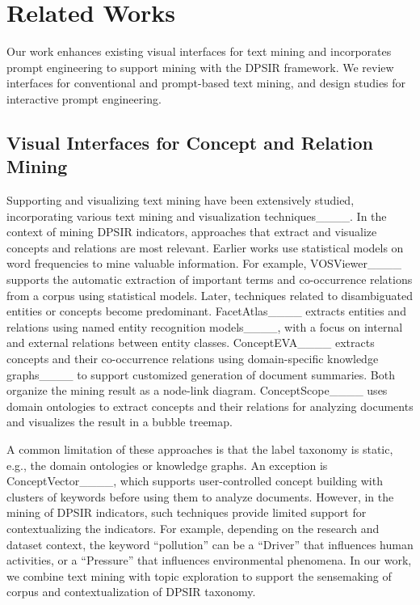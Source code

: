 \section{Related Works}
Our work enhances existing visual interfaces for text mining and incorporates prompt engineering to support mining with the DPSIR framework.
We review interfaces for conventional and prompt-based text mining, and design studies for interactive prompt engineering.

\vspace*{-0.15cm}
\subsection{Visual Interfaces for Concept and Relation Mining}
Supporting and visualizing text mining have been extensively studied, incorporating various text mining and visualization techniques____. 
In the context of mining DPSIR indicators, approaches that extract and visualize concepts and relations are most relevant.
Earlier works use statistical models on word frequencies to mine valuable information.
For example, VOSViewer____ supports the automatic extraction of important terms and co-occurrence relations from a corpus using statistical models. 
Later, techniques related to disambiguated entities or concepts become predominant.
FacetAtlas____ extracts entities and relations using named entity recognition models____, with a focus on internal and external relations between entity classes. 
ConceptEVA____ extracts concepts and their co-occurrence relations using domain-specific knowledge graphs____ to support customized generation of document summaries.
Both organize the mining result as a node-link diagram.
ConceptScope____ uses domain ontologies to extract concepts and their relations for analyzing documents and visualizes the result in a bubble treemap.

A common limitation of these approaches is that the label taxonomy is static, e.g., the domain ontologies or knowledge graphs.
An exception is ConceptVector____, which supports user-controlled concept building with clusters of keywords before using them to analyze documents.
However, in the mining of DPSIR indicators, such techniques provide limited support for contextualizing the indicators. 
For example, depending on the research and dataset context, the keyword ``pollution'' can be a ``Driver'' that influences human activities, or a ``Pressure'' that influences environmental phenomena. 
In our work, we combine text mining with topic exploration to support the sensemaking of corpus and contextualization of DPSIR taxonomy.

